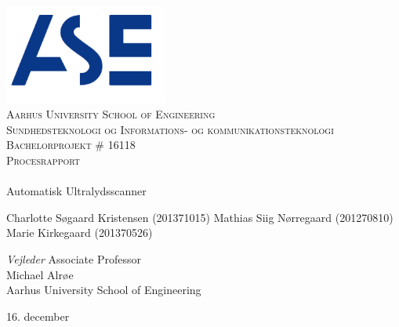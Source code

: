 
\begin{center}

~ \\[3cm]

\includegraphics[width=0.4\textwidth]{figurer/ASE}~\\[1cm]

\textsc{\LARGE Aarhus University School of Engineering}\\[1.5cm]

\textsc{\Large Sundhedsteknologi og Informations- og kommunikationsteknologi}\\ [0.33cm]
\textsc{\Large Bachelorprojekt \# 16118}\\[0.33cm]
\textsc{\LARGE Procesrapport} \\[1cm]

\noindent\makebox[\linewidth]{\rule{\textwidth}{0.4pt}}\\
[0.5cm]{\Huge Automatisk Ultralydsscanner}
\noindent\makebox[\linewidth]{\rule{\textwidth}{0.4pt}}

\end{center}
Charlotte Søgaard Kristensen (201371015) \newline
Mathias Siig Nørregaard  (201270810)\newline		 
Marie Kirkegaard (201370526) \newline  

\textit{Vejleder} \newline
Associate Professor\\
Michael Alrøe\\
Aarhus University School of Engineering


\vfill

\begin{center}
{\large 16. december}
\end{center}

